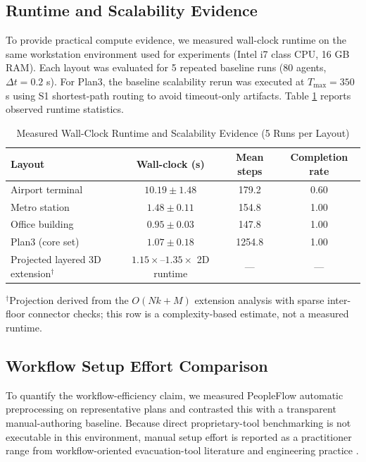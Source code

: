 \documentclass[journal]{IEEEtran}
\begin{document}
\subsection{Runtime and Scalability Evidence}
To provide practical compute evidence, we measured wall-clock runtime on the same workstation environment used for experiments (Intel i7 class CPU, 16 GB RAM). Each layout was evaluated for 5 repeated baseline runs (80 agents, $\Delta t=0.2$ s). For Plan3, the baseline scalability rerun was executed at $T_{\max}=350$ s using S1 shortest-path routing to avoid timeout-only artifacts. Table \ref{tab:runtime_scalability} reports observed runtime statistics.

\begin{table}[t]
\centering
\caption{Measured Wall-Clock Runtime and Scalability Evidence (5 Runs per Layout)}
\label{tab:runtime_scalability}
{\footnotesize
\setlength{\tabcolsep}{3pt}
\begin{tabular}{>{\raggedright\arraybackslash}p{2.1cm}ccc}
\toprule
\textbf{Layout} & \textbf{Wall-clock (s)} & \textbf{Mean steps} & \textbf{Completion rate} \\
\midrule
Airport terminal & $10.19 \pm 1.48$ & 179.2 & 0.60 \\
Metro station & $1.48 \pm 0.11$ & 154.8 & 1.00 \\
Office building & $0.95 \pm 0.03$ & 147.8 & 1.00 \\
Plan3 (core set) & $1.07 \pm 0.18$ & 1254.8 & 1.00 \\
Projected layered 3D extension$^\dagger$ & $1.15\times$--$1.35\times$ 2D runtime & --- & --- \\
\bottomrule
\end{tabular}
}
\end{table}

{\footnotesize $^\dagger$Projection derived from the $O(Nk+M)$ extension analysis with sparse inter-floor connector checks; this row is a complexity-based estimate, not a measured runtime.}

\subsection{Workflow Setup Effort Comparison}
To quantify the workflow-efficiency claim, we measured PeopleFlow automatic preprocessing on representative plans and contrasted this with a transparent manual-authoring baseline. Because direct proprietary-tool benchmarking is not executable in this environment, manual setup effort is reported as a practitioner range from workflow-oriented evacuation-tool literature and engineering practice \cite{path_planning,ronchi2015}.
\end{document}
